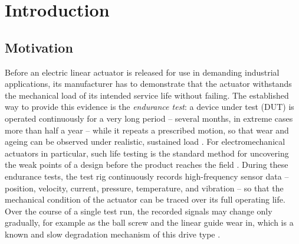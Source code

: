 \chapter{Introduction}
\label{kap:Einleitung}
\renewcommand{\thepage}{\arabic{page}}
\setcounter{page}{1}

%

\section{Motivation}
\label{sec:Einleitung_Motivation}

Before an electric linear actuator is released for use in demanding industrial
applications, its manufacturer has to demonstrate that the actuator withstands the
mechanical load of its intended service life without failing. The established way to
provide this evidence is the \emph{endurance test}: a device under test (DUT) is operated
continuously for a very long period -- several months, in extreme cases more than half a
year -- while it repeats a prescribed motion, so that wear and ageing can be observed
under realistic, sustained load \parencite{oconnor_practical_2012}. For
electromechanical actuators in particular, such life testing is the standard method for
uncovering the weak points of a design before the product reaches the
field \parencite{han_accelerated_2019}. During these endurance tests, the test rig
continuously records high-frequency sensor data -- position, velocity, current,
pressure, temperature, and vibration -- so that the mechanical condition of the actuator
can be traced over its full operating life. Over the course of a single test run, the
recorded signals may change only gradually, for example as the ball screw and the linear
guide wear in, which is a known and slow degradation mechanism of this drive
type \parencite{ma_wear_2024}.

